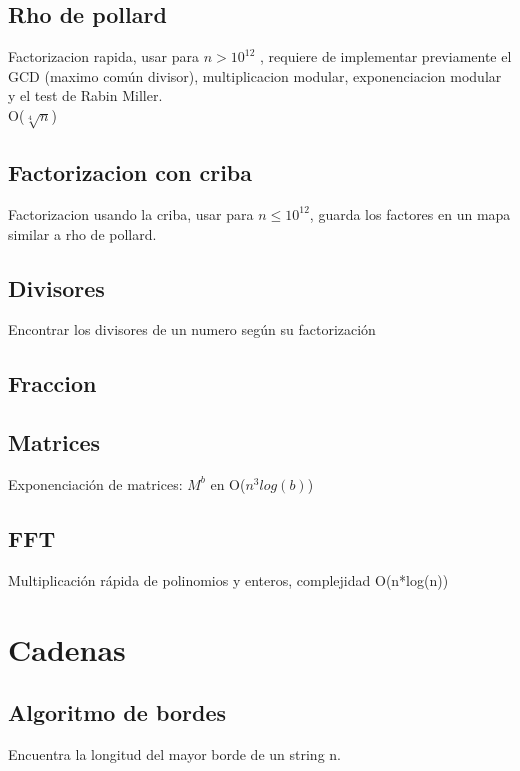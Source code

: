 \documentclass[10pt,landscape,twocolumn,letterpaper,twosided]{article}
\newcommand\cppfile[2][]{

}
\begin{document}
			\subsection{Rho de pollard}
			Factorizacion rapida, usar para $n > 10^{12}$ , requiere de implementar previamente el GCD
			(maximo común divisor), multiplicacion modular,	exponenciacion modular y el test de Rabin Miller.\\
			O($\sqrt[4]{n}$)
			\cppfile[52-77]{matematicas/rho_de_pollard.cpp}
			\subsection{Factorizacion con criba}
			Factorizacion usando la criba, usar para $n \leq 10^{12}$, guarda los factores en un mapa 
			similar a rho de pollard.
			\cppfile[10-48]{matematicas/factorizacion_criba.cpp}
			\subsection{Divisores}
			Encontrar los divisores de un numero según su factorización
			\cppfile[82-100]{matematicas/divisores.cpp}
			\subsection{Fraccion}
			\cppfile[9-47]{matematicas/fraccion.cpp}
			\subsection{Matrices}
			Exponenciación de matrices: $M^b$ en O($n^{3} log (b)$)
			\cppfile[8-36]{matematicas/matrices.cpp}
			\subsection{FFT}
			Multiplicación rápida de polinomios y enteros, complejidad O(n*log(n))
			\cppfile[10-67]{matematicas/FFT.cpp}
		\section{Cadenas}
			\subsection{Algoritmo de bordes}
			Encuentra la longitud del mayor borde de un string n.
			\cppfile[4-16]{cadenas/bordes.cpp}
\end{document}
